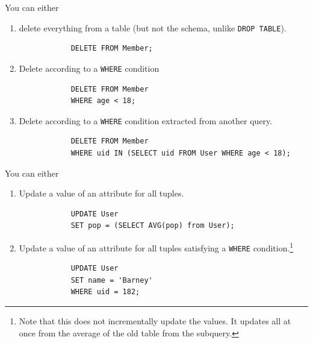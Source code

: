 \documentclass{article}
\begin{document}
    \begin{definition}
      You can either 
      \begin{enumerate}
        \item delete everything from a table (but not the schema, unlike \texttt{DROP TABLE}). 
          \begin{lstlisting}
            DELETE FROM Member; 
          \end{lstlisting}

        \item Delete according to a \texttt{WHERE} condition 
          \begin{lstlisting}
            DELETE FROM Member 
            WHERE age < 18; 
          \end{lstlisting}

        \item Delete according to a \texttt{WHERE} condition extracted from another query. 
          \begin{lstlisting}
            DELETE FROM Member 
            WHERE uid IN (SELECT uid FROM User WHERE age < 18); 
          \end{lstlisting}
          
      \end{enumerate}
    \end{definition}

    \begin{definition}
      You can either 
      \begin{enumerate}
        \item Update a value of an attribute for all tuples. 
          \begin{lstlisting}
            UPDATE User 
            SET pop = (SELECT AVG(pop) from User); 
          \end{lstlisting}

        \item Update a value of an attribute for all tuples satisfying a \texttt{WHERE} condition.\footnote{Note that this does not incrementally update the values. It updates all at once from the average of the old table from the subquery.}
          \begin{lstlisting}
            UPDATE User 
            SET name = 'Barney' 
            WHERE uid = 182; 
          \end{lstlisting}
      \end{enumerate}
    \end{definition}
\end{document}
